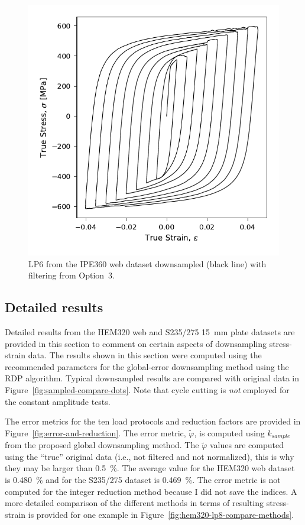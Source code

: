 \documentclass[a4paper,11pt]{article}
\begin{document}
\begin{figure}
    \centering
    \includegraphics{LP6_downsampled_WP3_IPE360_C_CRM8_op3_.pdf}
    \caption{LP6 from the IPE360 web dataset downsampled (black line) with filtering from Option~3.}
    \label{fig:filtering-compare-downsampled}
\end{figure}

\subsection{Detailed results}

Detailed results from the HEM320 web and S235/275 15~mm plate datasets are provided in this section to comment on certain aspects of downsampling stress-strain data.
The results shown in this section were computed using the recommended parameters for the global-error downsampling method using the RDP algorithm.
Typical downsampled results are compared with original data in Figure~\ref{fig:sampled-compare-dots}.
Note that cycle cutting is \emph{not} employed for the constant amplitude tests.

The error metrics for the ten load protocols and reduction factors are provided in Figure~\ref{fig:error-and-reduction}.
The error metric, $\tilde{\varphi}$, is computed using $k_{sample}$ from the proposed global downsampling method.
The $\tilde{\varphi}$ values are computed using the ``true'' original data (i.e., not filtered and not normalized), this is why they may be larger than 0.5~\%.
The average value for the HEM320 web dataset is 0.480~\% and for the S235/275 dataset is 0.469~\%.
The error metric is not computed for the integer reduction method because I did not save the indices.
A more detailed comparison of the different methods in terms of resulting stress-strain is provided for one example in Figure~\ref{fig:hem320-lp8-compare-methods}.
\end{document}
